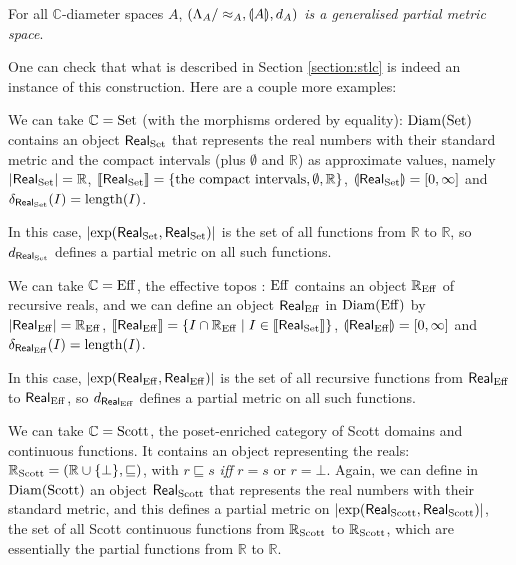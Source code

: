 \begin{proposition} For all $\mathbb{C}$-diameter spaces $A$, \emph{$(\Lambda_{A}/\approx_{A}, \llparenthesis A \rrparenthesis, d_{A})$ is a generalised partial metric space}.
\end{proposition}

One can check that what is described in Section \ref{section:stlc} is indeed an instance of this construction. Here are a couple more examples:

\begin{example} We can take $\mathbb{C} = \operatorname{Set}$ (with the morphisms ordered by equality): $\operatorname{Diam}(\operatorname{Set})$ contains an object $\mathsf{Real}_{\operatorname{Set}}$ that represents the real numbers with their standard metric and the compact intervals (plus $\emptyset$ and $\mathbb{R}$) as approximate values, namely $\left\vert\mathsf{Real}_{\operatorname{Set}}\right\vert = \mathbb{R}$, $\llbracket \mathsf{Real}_{\operatorname{Set}} \rrbracket = \{ \text{the compact intervals}, \emptyset, \mathbb{R} \}$, $\llparenthesis \mathsf{Real}_{\operatorname{Set}} \rrparenthesis = [0,\infty]$ and $\delta_{\mathsf{Real}_{\operatorname{Set}}}(I) = \operatorname{length}(I)$.

In this case, $\left\vert\exp(\mathsf{Real}_{\operatorname{Set}}, \mathsf{Real}_{\operatorname{Set}})\right\vert$ is the set of all functions from $\mathbb{R}$ to $\mathbb{R}$, so $d_{\mathsf{Real}_{\operatorname{Set}}}$ defines a partial metric on all such functions.
\end{example}

\begin{example} We can take $\mathbb{C} = \operatorname{Eff}$, the effective topos \cite{hyland:effective-topos}: $\operatorname{Eff}$ contains an object $\mathbb{R}_{\operatorname{Eff}}$ of recursive reals, and we can define an object $\mathsf{Real}_{\operatorname{Eff}}$ in $\operatorname{Diam}(\operatorname{Eff})$ by $\left\vert\mathsf{Real}_{\operatorname{Eff}}\right\vert = \mathbb{R}_{\operatorname{Eff}}$, $\llbracket \mathsf{Real}_{\operatorname{Eff}} \rrbracket = \{ I \cap \mathbb{R}_{\operatorname{Eff}} \mid I \in \llbracket \mathsf{Real}_{\operatorname{Set}} \rrbracket \}$, $\llparenthesis \mathsf{Real}_{\operatorname{Eff}} \rrparenthesis = [0,\infty]$ and $\delta_{\mathsf{Real}_{\operatorname{Eff}}}(I) = \operatorname{length}(I)$.

In this case, $\left\vert\exp(\mathsf{Real}_{\operatorname{Eff}}, \mathsf{Real}_{\operatorname{Eff}})\right\vert$ is the set of all recursive functions from $\mathsf{Real}_{\operatorname{Eff}}$ to $\mathsf{Real}_{\operatorname{Eff}}$, so $d_{\mathsf{Real}_{\operatorname{Eff}}}$ defines a partial metric on all such functions.
\end{example}

\begin{example} We can take $\mathbb{C} = \operatorname{Scott}$, the poset-enriched category of Scott domains and continuous functions. It contains an object representing the reals: $\mathbb{R}_{\operatorname{Scott}} = (\mathbb{R} \cup \{ \bot \}, \sqsubseteq)$, with $r \sqsubseteq s$ \textit{iff} $r = s$ or $r = \bot$. Again, we can define in  $\operatorname{Diam}(\operatorname{Scott})$ an object $\mathsf{Real}_{\operatorname{Scott}}$ that represents the real numbers with their standard metric, and this defines a partial metric on $\left\vert\exp(\mathsf{Real}_{\operatorname{Scott}}, \mathsf{Real}_{\operatorname{Scott}})\right\vert$, the set of all Scott continuous functions from $\mathbb{R}_{\operatorname{Scott}}$ to $\mathbb{R}_{\operatorname{Scott}}$, which are essentially the partial functions from $\mathbb{R}$ to $\mathbb{R}$.
\end{example}

 